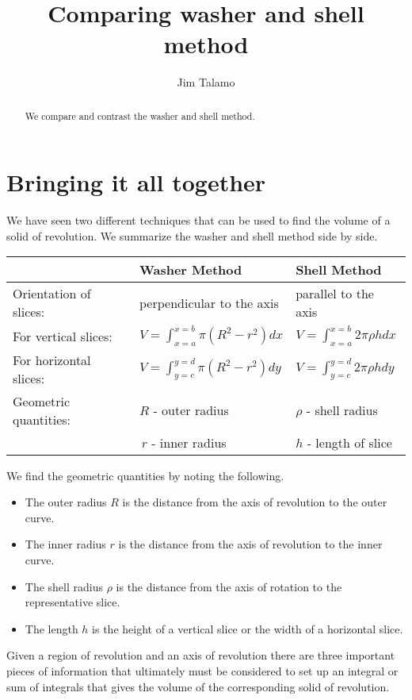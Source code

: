 \documentclass{ximera}
\author{Jim Talamo}
\title[Dig-In:]{Comparing washer and shell method}
\begin{document}
\begin{abstract}
 We compare and contrast the washer and shell method.
 \end{abstract}
\maketitle

\section{Bringing it all together}
We have seen two different techniques that can be used to find the volume of a solid of revolution.  We summarize the washer and shell method side by side.

\begin{tabular}{l|l|l}
& \qquad Washer Method & \qquad Shell Method \\
\hline \hline
Orientation of slices: & perpendicular to the axis & parallel to the axis \\
For vertical slices: &$V=\int_{x=a}^{x=b} \pi(R^2-r^2) dx$ & $V=\int_{x=a}^{x=b} 2\pi \rho h dx$ \\
For horizontal slices: &$V=\int_{y=c}^{y=d} \pi(R^2-r^2) dy$ & $V=\int_{y=c}^{y=d} 2\pi \rho h dy$ \\
Geometric quantities: & $R$ - outer radius & $\rho$ - shell radius \\
&\,$r$ - inner radius & $h$ - length of slice \\
\end{tabular}

We find the geometric quantities by noting the following.

\begin{itemize}
\item The outer radius $R$ is the distance from the axis of revolution to the outer curve.
\item The inner radius $r$ is the distance from the axis of revolution to the inner curve.
\item The shell radius $\rho$ is the distance from the axis of rotation to the representative slice.
\item The length $h$ is the height of a vertical slice or the width of a horizontal slice.
\end{itemize}


Given a region of revolution and an axis of revolution there are three important pieces of information that ultimately must be considered to set up an integral or sum of integrals that gives the volume of the corresponding solid of revolution.
\end{document}
